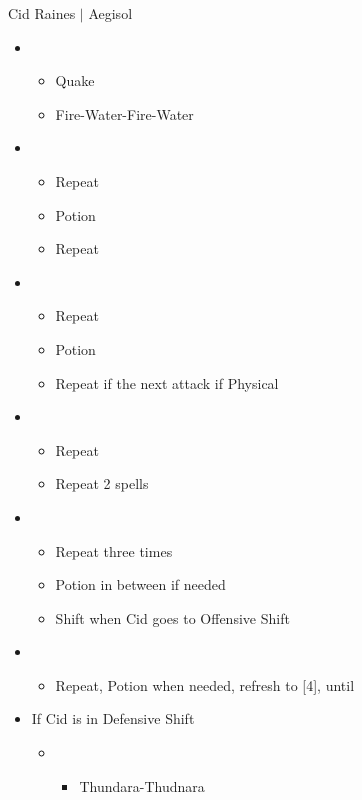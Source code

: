 \documentclass{report}
\begin{document}
\begin{battle}{Cid Raines $|$ Aegisol}
\begin{multicols}{2}
\begin{itemize}
    \item \first
    \begin{itemize}
        \item Quake
        \item Fire-Water-Fire-Water
    \end{itemize}
    \item \third
    \begin{itemize}
        \item Repeat
        \item Potion
        \item Repeat
    \end{itemize}
    \item \fourth
    \begin{itemize}
        \item Repeat
        \item Potion
        \item Repeat if the next attack if Physical
    \end{itemize}
    \item \fifth
    \begin{itemize}
        \item Repeat
        \item Repeat 2 spells
    \end{itemize}
    \item \second
    \begin{itemize}
        \item Repeat three times
        \item Potion in between if needed
        \item Shift when Cid goes to Offensive Shift
    \end{itemize}
    \item \third
    \begin{itemize}
        \item Repeat, Potion when needed, refresh to [4], until \stagger
    \end{itemize}
    \item If Cid is in Defensive Shift
    \begin{itemize}
        \item \second
        \begin{itemize}
            \item Thundara-Thudnara

\end{itemize}
\end{itemize}
\end{itemize}
\end{multicols}
\end{battle}
\end{document}

